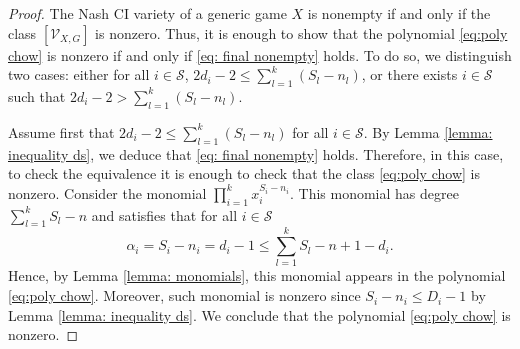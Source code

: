 \documentclass[10pt,a4paper]{amsart}
\newcommand{\Vc}{{\mathcal V}_{X,G}}
\begin{document}
\begin{proof}
The Nash CI variety of a generic game $X$ is nonempty if and only if the class $\left[ \Vc\right]$ is nonzero. Thus, it is enough to show that the polynomial \eqref{eq:poly chow} is nonzero if and only if \eqref{eq: final nonempty} holds.
    To do so, we distinguish two cases: either  for all $ i\in\mathcal S$, $2d_i-2\leq \sum_{l=1}^k(S_l-n_l)$, or there exists $ i\in\mathcal S$ such that $2d_i-2>\sum_{l=1}^k(S_l-n_l)$.


Assume first that $2d_i-2\leq \sum_{l=1}^k(S_l-n_l)$ for all $i\in\mathcal S$. By Lemma \ref{lemma: inequality ds},  we deduce that \eqref{eq: final nonempty} holds. Therefore, in this case, to check the equivalence it is enough to check that the class \eqref{eq:poly chow} is nonzero.
Consider the monomial $\prod_{i=1}^kx_i^{S_i-n_i}$. This monomial has degree $\sum_{l=1}^k S_l-n$ and satisfies that for all $i\in\mathcal S$  $$\alpha_i=S_i-n_i=d_i-1\leq \sum_{l=1}^kS_l -n+1-d_i.$$ 
    Hence, by Lemma \ref{lemma: monomials}, this monomial appears in the polynomial \eqref{eq:poly chow}. Moreover,  such monomial is nonzero since $S_i-n_i\le D_i-1$ by Lemma \ref{lemma: inequality ds}. We conclude that the polynomial \eqref{eq:poly chow} is nonzero.



\end{proof}
\end{document}
